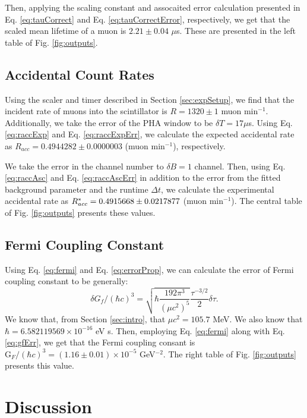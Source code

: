 \documentclass[
    aps, 
    twocolumn, 
    secnumarabic, 
    balancelastpage, 
    amsmath, 
    amssymb, 
    nofootinbib, 
    floatfix
]{revtex4-2}
\begin{document}
Then, applying the scaling constant and assocaited error calculation presented in Eq. \eqref{eq:tauCorrect} and Eq. \eqref{eq:tauCorrectError}, respectively, we get that the scaled mean lifetime of a muon is $2.21 \pm 0.04$ $\mu$s. These are presented in the left table of Fig. \ref{fig:outputs}.  

\subsection{Accidental Count Rates}

Using the scaler and timer described in Section \ref{sec:expSetup}, we find that the incident rate of muons into the scintillator is $R = 1320 \pm 1$ muon min$^{-1}$. Additionally, we take the error of the PHA window to be $\delta T = 17 \mu$s. Using Eq. \eqref{eq:raccExp} and Eq. \eqref{eq:raccExpErr}, we calculate the expected accidental rate as $R_{acc} = 0.4944282\pm 0.0000003$ (muon min$^{-1}$), respectively. 

We take the error in the channel number to $\delta B = 1$ channel. Then, using Eq. \eqref{eq:raccAsc} and Eq. \eqref{eq:raccAscErr} in addition to the error from the fitted background parameter and the runtime $\Delta t$, we calculate the experimental accidental rate as $R_{acc}^{\**} = 0.4915668 \pm 0.0217877$ (muon min$^{-1}$). The central table of Fig. \ref{fig:outputs} presents these values.

\subsection{Fermi Coupling Constant}

Using Eq. \eqref{eq:fermi} and Eq. \eqref{eq:errorProp}, we can calculate the error of Fermi coupling constant to be generally:
\begin{equation}
	\delta G_f/(\hbar c)^3 = \sqrt{\hbar\dfrac{192\pi^3}{(\mu c^2)^5}} \dfrac{\tau^{-3/2}}{2} \delta\tau.
	\label{eq:gfErr}
\end{equation}
We know that, from Section \ref{sec:intro}, that $\mu c^2 = 105.7$ MeV. We also know that $\hbar = 6.582119569 \times 10^{-16}$ eV s. Then, employing Eq. \eqref{eq:fermi} along with Eq. \eqref{eq:gfErr}, we get that the Fermi coupling consant is $\text{G}_F/(\hbar c)^3 = (1.16 \pm 0.01) \times 10^{-5}$ GeV$^{-2}$. The right table of Fig. \ref{fig:outputs} presents this value.

\section{Discussion}
\end{document}
